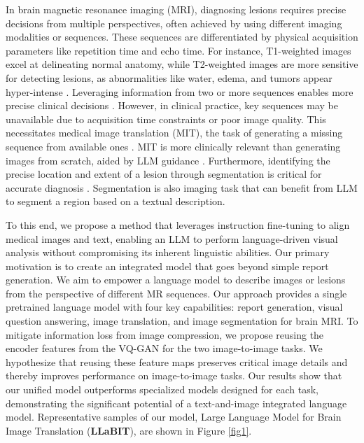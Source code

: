 In brain magnetic resonance imaging (MRI), diagnosing lesions requires precise decisions from multiple perspectives, often achieved by using different imaging modalities or sequences. These sequences are differentiated by physical acquisition parameters like repetition time and echo time. For instance, T1-weighted images excel at delineating normal anatomy, while T2-weighted images are more sensitive for detecting lesions, as abnormalities like water, edema, and tumors appear hyper-intense \cite{damadian1971tumor,bradley1984comparison}. Leveraging information from two or more sequences enables more precise clinical decisions \cite{cha2006update,ellingson2015consensus}. However, in clinical practice, key sequences may be unavailable due to acquisition time constraints or poor image quality. This necessitates medical image translation (MIT), the task of generating a missing sequence from available ones \cite{kim2024adaptive}. MIT is more clinically relevant than generating images from scratch, aided by LLM guidance \cite{lee2024llmcxr}. Furthermore, identifying the precise location and extent of a lesion through segmentation is critical for accurate diagnosis \cite{kwon2024leveraging,kim2025weakly,kim2025enhancing,kwon2025blood}. Segmentation is also imaging task that can benefit from LLM to segment a region based on a textual description. 

To this end, we propose a method that leverages instruction fine-tuning to align medical images and text, enabling an LLM to perform language-driven visual analysis without compromising its inherent linguistic abilities. Our primary motivation is to create an integrated model that goes beyond simple report generation. We aim to empower a language model to describe images or lesions from the perspective of different MR sequences. Our approach provides a single pretrained language model with four key capabilities: report generation, visual question answering, image translation, and image segmentation for brain MRI. To mitigate information loss from image compression, we propose reusing the encoder features from the VQ-GAN for the two image-to-image tasks. We hypothesize that reusing these feature maps preserves critical image details and thereby improves performance on image-to-image tasks. Our results show that our unified model outperforms specialized models designed for each task, demonstrating the significant potential of a text-and-image integrated language model. Representative samples of our model, Large Language Model for Brain Image Translation (\textbf{LLaBIT}), are shown in Figure \ref{fig1}.

